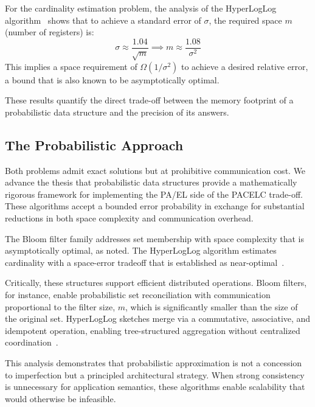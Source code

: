 For the cardinality estimation problem, the analysis of the HyperLogLog algorithm~\cite{flajolet2007hyperloglog} shows that to achieve a standard error of $\sigma$, the required space $m$ (number of registers) is:
\begin{equation}
    \sigma \approx \frac{1.04}{\sqrt{m}} \implies m \approx \frac{1.08}{\sigma^2}
\end{equation}
This implies a space requirement of $\Omega(1/\sigma^2)$ to achieve a desired relative error, a bound that is also known to be asymptotically optimal.

These results quantify the direct trade-off between the memory footprint of a probabilistic data structure and the precision of its answers. 

\subsection{The Probabilistic Approach}

Both problems admit exact solutions but at prohibitive communication cost. We advance the thesis that probabilistic data structures provide a mathematically rigorous framework for implementing the PA/EL side of the PACELC trade-off. These algorithms accept a bounded error probability in exchange for substantial reductions in both space complexity and communication overhead.

The Bloom filter family addresses set membership with space complexity that is asymptotically optimal, as noted. The HyperLogLog algorithm estimates cardinality with a space-error tradeoff that is established as near-optimal~\cite{flajolet2007hyperloglog}.

Critically, these structures support efficient distributed operations. Bloom filters, for instance, enable probabilistic set reconciliation with communication proportional to the filter size, $m$, which is significantly smaller than the size of the original set. HyperLogLog sketches merge via a commutative, associative, and idempotent operation, enabling tree-structured aggregation without centralized coordination~\cite{heule2013hyperloglog}.

This analysis demonstrates that probabilistic approximation is not a concession to imperfection but a principled architectural strategy. When strong consistency is unnecessary for application semantics, these algorithms enable scalability that would otherwise be infeasible.
